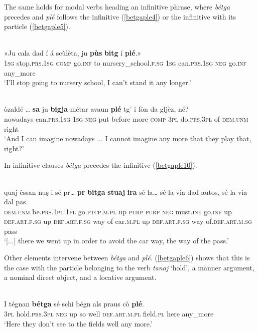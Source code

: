 The same holds for modal verbs heading an infinitive phrase, where \textit{bétga} precedes and \textit{plé} follows the infinitive (\ref{betgaple4}) or the infinitive with its particle (\ref{betgaple5}).

\ea
\label{betgaple4}
\\
\gll  «Ju cala dad í á scùlèta, ju \textbf{pùs} \textbf{bitg} í \textbf{plé}.»\\
\textsc{1sg} stop.\textsc{prs.1sg} \textsc{comp} go.\textsc{inf} to nursery\_school.\textsc{f.sg} \textsc{1sg} can.\textsc{prs.1sg} \textsc{neg} go.\textsc{inf} any\_more  \\
\glt `I’ll stop going to nursery school, I can’t stand it any longer.'
\z

\ea
\label{betgaple5}
\\
\gll [...] òzaldé … \textbf{sa} ju \textbf{bigja} métar avaun \textbf{plé} tg’ i fòn da gljèz, né?    \\
{} nowadays {} can.\textsc{prs.1sg} \textsc{1sg} \textsc{neg} put before more \textsc{comp} \textsc{3pl} do.\textsc{prs.3pl} of \textsc{dem.unm} right \\
\glt `And I can imagine nowadays ... I cannot imagine any more that they play that, right?'
\z

In infinitive clauses \textit{bétga} precedes the infinitive (\ref{betgaple10}).

\ea
\label{betgaple10}
\\
\gll  [...] quaj èssan nuṣ i sé pr… \textbf{pr} \textbf{bitga} \textbf{stuaj} \textbf{ira} sé la… sé la via dad autos, sé la via dal pas. \\
{} \textsc{dem.unm} be.\textsc{prs.1pl} \textsc{1pl} go.\textsc{ptcp.m.pl} up \textsc{purp} \textsc{purp} \textsc{neg} must.\textsc{inf} go.\textsc{inf} up \textsc{def.art.f.sg} up \textsc{def.art.f.sg} way of car.\textsc{m.pl} up \textsc{def.art.f.sg} way of.\textsc{def.art.m.sg} pass  \\
\glt `[...] there we went up in order to avoid the car way, the way of the pass.'
\z

Other elements intervene between \textit{bétga} and \textit{plé}. (\ref{betgaple6}) shows that this is the case with the particle belonging to the verb \textit{tanaj} `hold', a manner argument, a nominal direct object, and a locative argument.

\ea
\label{betgaple6}
\\
\gll   I tégnan \textbf{bétga} sé schi bégn als praus cò \textbf{plé}. \\
\textsc{3pl} hold.\textsc{prs.3pl} \textsc{neg} up so well \textsc{def.art.m.pl} field.\textsc{pl} here any\_more \\
\glt `Here they don’t see to the fields well any more.'
\z

